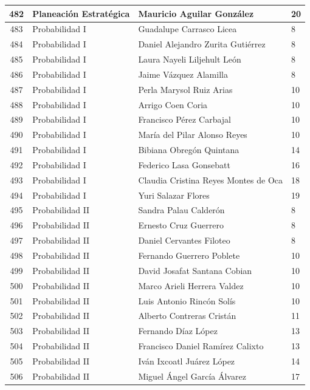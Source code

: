 {\begin{longtable}{|c|p{6.5cm}|p{5cm}|p{1.5cm}|}
  482 & Planeación Estratégica & Mauricio Aguilar González & 20 \\ \hline
  483 & Probabilidad I & Guadalupe Carrasco Licea & 8 \\ \hline
  484 & Probabilidad I & Daniel Alejandro Zurita Gutiérrez & 8 \\ \hline
  485 & Probabilidad I & Laura Nayeli Liljehult León & 8 \\ \hline
  486 & Probabilidad I & Jaime Vázquez Alamilla & 8 \\ \hline
  487 & Probabilidad I & Perla Marysol Ruiz Arias & 10 \\ \hline
  488 & Probabilidad I & Arrigo Coen Coria & 10 \\ \hline
  489 & Probabilidad I & Francisco Pérez Carbajal & 10 \\ \hline
  490 & Probabilidad I & María del Pilar Alonso Reyes & 10 \\ \hline
  491 & Probabilidad I & Bibiana Obregón Quintana & 14 \\ \hline
  492 & Probabilidad I & Federico Lasa Gonsebatt & 16 \\ \hline
  493 & Probabilidad I & Claudia Cristina Reyes Montes de Oca & 18 \\ \hline
  494 & Probabilidad I & Yuri Salazar Flores & 19 \\ \hline
  495 & Probabilidad II & Sandra Palau Calderón & 8 \\ \hline
  496 & Probabilidad II & Ernesto Cruz Guerrero & 8 \\ \hline
  497 & Probabilidad II & Daniel Cervantes Filoteo & 8 \\ \hline
  498 & Probabilidad II & Fernando Guerrero Poblete & 10 \\ \hline
  499 & Probabilidad II & David Josafat Santana Cobian & 10 \\ \hline
  500 & Probabilidad II & Marco Arieli Herrera Valdez & 10 \\ \hline
  501 & Probabilidad II & Luis Antonio Rincón Solís & 10 \\ \hline
  502 & Probabilidad II & Alberto Contreras Cristán & 11 \\ \hline
  503 & Probabilidad II & Fernando Díaz López & 13 \\ \hline
  504 & Probabilidad II & Francisco Daniel Ramírez Calixto & 13 \\ \hline
  505 & Probabilidad II & Iván Ixcoatl Juárez López & 14 \\ \hline
  506 & Probabilidad II & Miguel Ángel García Álvarez & 17 \\ \hline

\end{longtable}}

